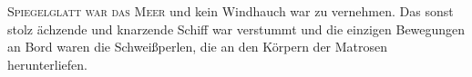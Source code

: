 \lettrine{S}{piegelglatt war das Meer} und kein Windhauch war zu vernehmen.  Das sonst stolz ächzende und knarzende Schiff war verstummt und die einzigen Bewegungen an Bord waren die Schweißperlen, die an den Körpern der Matrosen herunterliefen.


